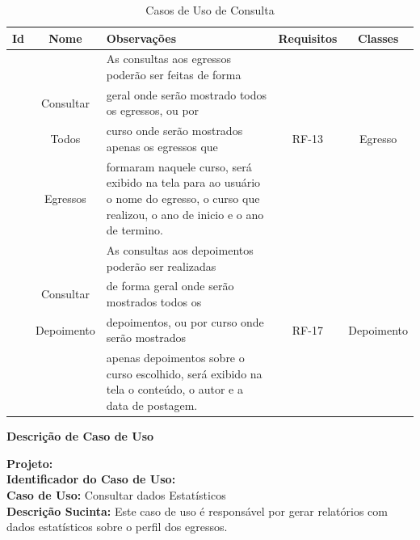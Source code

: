 \begin{table}[h]
	\centering  \vspace{0.5cm} 	\footnotesize 
	\caption{Casos de Uso de Consulta}
	\begin{tabular}{|c|c|p{8cm}|c|c|} \hline  \rowcolor[rgb]{0.8,0.8,0.8}
 				
 		Id & Nome   &  Observações & Requisitos   & Classes  \\ 	\hline	
 		
 		{}  &  {}  &   As consultas aos egressos poderão ser feitas de forma  & {}   & {}    \\ 
 		{} &  Consultar   & geral onde serão mostrado todos os egressos, ou por  & {} & {} \\ 
 	    \UC\label{uc-consulta-todos-egresso}  &  Todos  & curso onde serão mostrados apenas os egressos que  & RF-13 & Egresso \\	
 	    {}  &  Egressos   &  formaram naquele curso, será exibido na tela para ao usuário o nome do egresso, o curso que realizou, o ano de inicio e o ano de termino.   & {}   & {}  \\	\hline
 	    
 	    
 	    
 	    {} &  {}  &  As consultas aos depoimentos poderão ser realizadas   & {}   & {}    \\ 
 		{} &  Consultar & de forma geral onde serão mostrados todos os  & {} & {} \\ 
 	    \UC\label{uc-consulta-depoimento} & Depoimento & depoimentos, ou por curso onde serão mostrados & RF-17 & Depoimento \\	
 	    {} & {}  & apenas depoimentos sobre o curso escolhido, será exibido na tela o conteúdo, o autor e a data de postagem. & {} & {} \\	\hline
 	    
 	     				
	\end{tabular}
	\label{tabela-public-consulta}
\end{table}




\newpage
\begin{flushright}    \textbf{Descrição de Caso de Uso}   \end{flushright}         
\noindent \textbf{Projeto:} \imprimirtitulo  \\
\textbf{Identificador do Caso de Uso:} \UC\label{uc-seminario} \\
\textbf{Caso de Uso:} Consultar dados Estatísticos \\
\noindent \textbf{Descrição Sucinta:} Este caso de uso é responsável por gerar relatórios com dados estatísticos sobre o perfil dos egressos.\\

